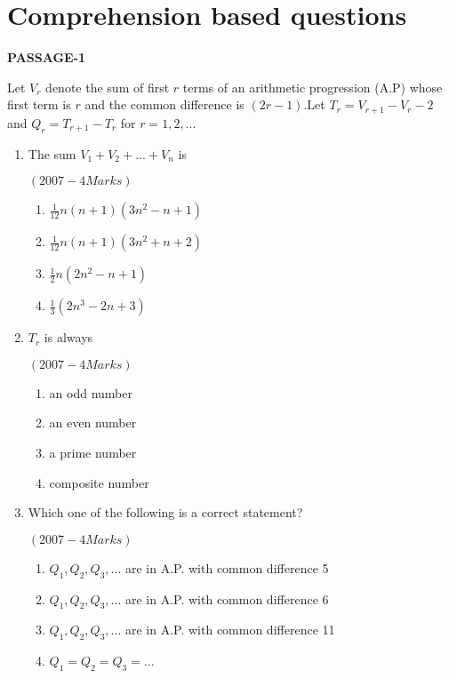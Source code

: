 \documentclass[journal,12pt,twocolumn]{IEEEtran}
\theoremstyle{remark}
\begin{document}
\section*{Comprehension based questions}
    \begin{center}    
      \textbf{PASSAGE-1}
    \end{center}
 Let $ V_{r} $ denote the sum of first $r$ terms of an arithmetic progression (A.P) whose first term is $r$ and the common difference is $(2r-1)$.Let $ T_{r}=V_{r+1}-V_{r}-2 $ and $ Q_{r}=T_{r+1}-T_{r}$ for $r=1,2,...$
 \\ 
 \begin{enumerate}

 \item The sum  $  V_{1}+V_{2}+...+V_{n} $  is 
 
	                            \hfill$(2007 -4 Marks)$                              
     \begin{enumerate}
         
	\item $\frac{1}{12}n(n+1)(3n^{2}-n+1)$
	\item $\frac{1}{12}n(n+1)(3n^2{}+n+2)$
	\item $\frac{1}{2}n(2n^{2}-n+1)$
	\item $\frac{1}{3}(2n^{3}-2n+3)$
    \end{enumerate} 

  \item $T_{r}$ is always 
                           
                                \hfill$(2007 -4 Marks)$                      
                  \begin{multicols}{2}      
                        \begin{enumerate} 
	
       \item an odd number 
       \item an even number
	\item a prime number 
        \item composite number

	  \end{enumerate}
   \end{multicols}
    \item Which one of the following is a correct statement? 
          
           \hfill$(2007 -4 Marks)$                                  
     \begin{enumerate}
	\item $Q_{1},Q_{2},Q_{3},...$ are in A.P. with common difference 5 
	\item $Q_{1},Q_{2},Q_{3},...$ are in A.P. with common difference 6
	\item $Q_{1},Q_{2},Q_{3},...$ are in A.P. with common difference 11
	\item $Q_{1}=Q_{2}=Q_{3}=...$
     \end{enumerate}



 \end{enumerate}

	






    
\end{document}
